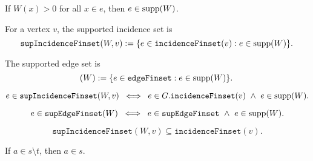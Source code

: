 \begin{lemma}\label{lem:sym2-insupport-rec}
\leanok
{}
If $W(x)>0$ for all $x\in e$, then $e\in\operatorname{supp}(W)$.
\end{lemma}

\begin{definition}\label{def:supincidencefinset}
\leanok
{}
For a vertex $v$, the supported incidence set is
\[
  \!\texttt{supIncidenceFinset}(W,v)
  := \{ e\in \texttt{incidenceFinset}(v) : e\in\operatorname{supp}(W)\}.
\]
\end{definition}

\begin{definition}\label{def:supedgefinset}
\leanok
{}
The supported edge set is
\[
  \!\texttt{}(W)
  := \{ e\in \texttt{edgeFinset} : e\in\operatorname{supp}(W)\}.
\]
\end{definition}

\begin{lemma}\label{lem:mem-supincidencefinset}
\leanok
{}
\[
  e\in \texttt{supIncidenceFinset}(W,v)
  \;\iff\; e\in G.\texttt{incidenceFinset}(v)\ \wedge\ e\in\supp(W).
\]
\end{lemma}

\begin{lemma}\label{lem:mem-supedgefinset}
\leanok
{}
\[
  e\in \texttt{supEdgeFinset}(W)
  \;\iff\; e\in \texttt{supEdgeFinset}\ \wedge\ e\in\supp(W).
\]
\end{lemma}

\begin{lemma}\label{lem:supincidencefinset-subset}
\leanok
{}
\[
  \texttt{supIncidenceFinset}(W,v)\subseteq \texttt{incidenceFinset}(v).
\]
\end{lemma}

\begin{lemma}\label{lem:in-sdiff-left}
\leanok
\uses{}
If $a\in s\setminus t$, then $a\in s$.
\end{lemma}


